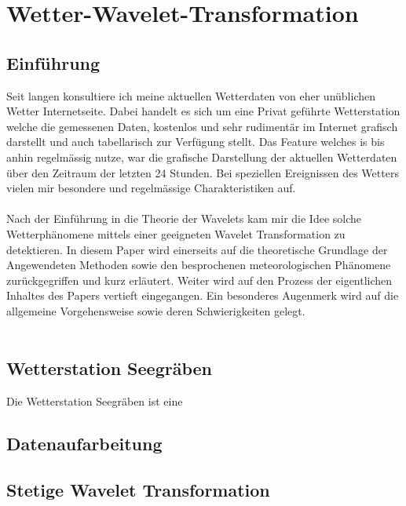 %
%
%
\chapter{Wetter-Wavelet-Transformation\label{chapter:wwt}}
\begin{refsection}

\section{Einführung}


Seit langen konsultiere ich meine aktuellen Wetterdaten von eher unüblichen Wetter Internetseite.
Dabei handelt es sich um eine Privat geführte Wetterstation welche die gemessenen Daten, kostenlos und sehr rudimentär im Internet grafisch darstellt und auch tabellarisch zur Verfügung stellt.
Das Feature welches is bis anhin regelmässig nutze, war die grafische Darstellung der aktuellen Wetterdaten über den Zeitraum der letzten 24 Stunden.
Bei speziellen Ereignissen des Wetters vielen mir besondere und regelmässige Charakteristiken auf.
\\
\\
Nach der Einführung in die Theorie der Wavelets kam mir die Idee solche Wetterphänomene mittels einer geeigneten Wavelet Transformation zu detektieren.
In diesem Paper wird einerseits auf die theoretische Grundlage der Angewendeten Methoden sowie den besprochenen meteorologischen Phänomene zurückgegriffen und kurz erläutert. 
Weiter wird auf den Prozess der eigentlichen Inhaltes des Papers vertieft eingegangen. Ein besonderes Augenmerk wird auf die allgemeine Vorgehensweise sowie deren Schwierigkeiten gelegt.
\\
\\

\section{Wetterstation Seegräben}

Die Wetterstation Seegräben ist eine

\section{Datenaufarbeitung}

\section{Stetige Wavelet Transformation}


\end{refsection}
